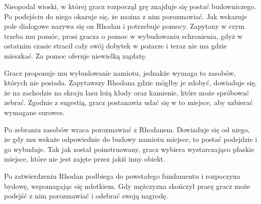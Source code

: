 Nieopodal wioski, w której gracz rozpoczął grę znajduje się postać budowniczego. Po podejściu do niego okazuje się, że
można z nim porozmawiać. Jak wskazuje pole dialogowe nazywa się on Rhodan i potrzebuje pomocy. Zapytany w czym trzeba mu
pomóc, prosi gracza o pomoc w wybudowaniu schronienia, gdyż w ostatnim czasie stracił cały swój dobytek w pożarze i
teraz nie ma gdzie mieszkać. Za pomoc oferuje niewielką zapłatę.

Gracz proponuje mu wybudowanie namiotu, jednakże wymaga to zasobów, których nie posiada. Zapytawszy Rhodana gdzie mógłby
je zdobyć, dowiaduje się, że na zachodzie na skraju lasu leżą kłody oraz kamienie, które może spróbować zebrać. Zgodnie
z sugestią, gracz postanawia udać się w to miejsce, aby uzbierać wymagane surowce.

Po zebraniu zasobów wraca porozmawiać z Rhodanem. Dowiaduje się od niego, że gdy mu wskaże odpowiednie do budowy namiotu
miejsce, to postać podejdzie i go wybuduje. Tak jak został poinstruowany, gracz wybiera wystarczająco płaskie miejsce,
które nie jest zajęte przez jakiś inny obiekt.

Po zatwierdzeniu Rhodan podbiega do powstałego fundamentu i rozpoczyna bydowę, wspomagając się
młotkiem. Gdy mężczyzna skończył pracę gracz może podejść z nim porozmawiać i odebrać swoją nagrodę.

